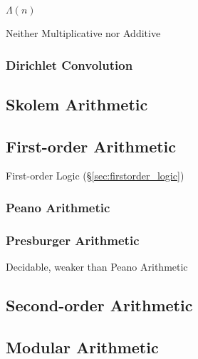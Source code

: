 $\Lambda(n)$

Neither Multiplicative nor Additive



\subsubsection{Dirichlet Convolution}\label{sec:dirichlet_convolution}



\subsection{Skolem Arithmetic}\label{sec:skolem_arithmetic}
\cite{skolem23}

\subsection{First-order Arithmetic}\label{sec:firstorder_arithmetic}

First-order Logic (\S\ref{sec:firstorder_logic})



\subsubsection{Peano Arithmetic}\label{sec:peano_arithmetic}

\subsubsection{Presburger Arithmetic}\label{sec:presburger_arithmetic}

Decidable, weaker than Peano Arithmetic



\subsection{Second-order Arithmetic}\label{sec:second_order_arithmetic}

\subsection{Modular Arithmetic}\label{sec:modular_arithmetic}

